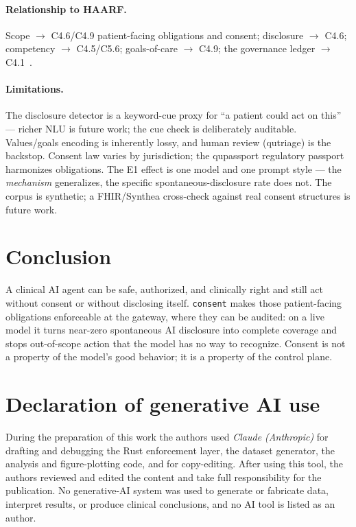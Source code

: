 \documentclass[11pt]{article}
\begin{document}
\paragraph{Relationship to HAARF.} Scope $\rightarrow$ C4.6/C4.9 patient-facing
obligations and consent; disclosure $\rightarrow$ C4.6; competency $\rightarrow$
C4.5/C5.6; goals-of-care $\rightarrow$ C4.9; the governance ledger $\rightarrow$
C4.1~\cite{schwoebel2026haarf}.

\paragraph{Limitations.} The disclosure detector is a keyword-cue proxy for ``a
patient could act on this'' --- richer NLU is future work; the cue check is
deliberately auditable. Values/goals encoding is inherently lossy, and human review
(qutriage) is the backstop. Consent law varies by jurisdiction; the qupassport regulatory
passport harmonizes obligations. The E1 effect is one model and one prompt style ---
the \emph{mechanism} generalizes, the specific spontaneous-disclosure rate does not.
The corpus is synthetic; a FHIR/Synthea cross-check against real consent structures
is future work.

\section{Conclusion}
A clinical AI agent can be safe, authorized, and clinically right and still act
without consent or without disclosing itself. \texttt{consent} makes those
patient-facing obligations enforceable at the gateway, where they can be audited:
on a live model it turns near-zero spontaneous AI disclosure into complete coverage
and stops out-of-scope action that the model has no way to recognize. Consent is not
a property of the model's good behavior; it is a property of the control plane.

\section*{Declaration of generative AI use}
During the preparation of this work the authors used \emph{Claude (Anthropic)} for
drafting and debugging the Rust enforcement layer, the dataset generator, the
analysis and figure-plotting code, and for copy-editing. After using this tool, the
authors reviewed and edited the content and take full responsibility for the
publication. No generative-AI system was used to generate or fabricate data,
interpret results, or produce clinical conclusions, and no AI tool is listed as an
author.
\end{document}
